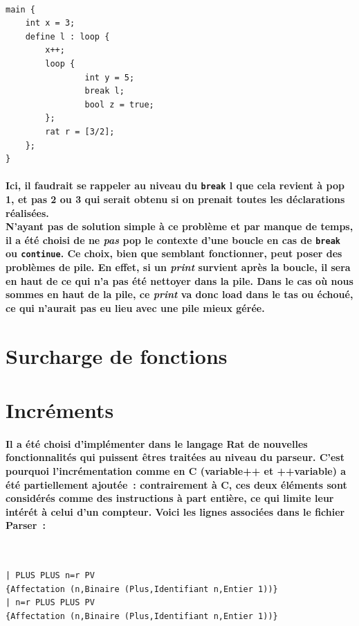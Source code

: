 \documentclass[french]{article}
\begin{document}
\, %
\begin{lstlisting}[language=ratcode]
main {
    int x = 3;
    define l : loop {
        x++;
        loop {
                int y = 5;
                break l;
                bool z = true;
        };
        rat r = [3/2];
    };
}
\end{lstlisting}
\paragraph*{Ici, il faudrait se rappeler au niveau du \texttt{break} l que cela revient à pop 1, et pas 2 ou 3 qui serait obtenu si on prenait toutes les déclarations réalisées.\\
N'ayant pas de solution simple à ce problème et par manque de temps, il a été choisi de ne \emph{pas} pop le contexte d'une boucle en cas de \texttt{break} ou \texttt{continue}.
Ce choix, bien que semblant fonctionner, peut poser des problèmes de pile. En effet, si un \emph{print} survient après la boucle, il sera en haut de ce qui n'a pas été nettoyer dans la pile.
Dans le cas où nous sommes en haut de la pile, ce \emph{print} va donc load dans le tas ou échoué, ce qui n'aurait pas eu lieu avec une pile mieux gérée.}

\section{Surcharge de fonctions}

\section{Incréments}
\paragraph*{Il a été choisi d'implémenter dans le langage Rat de nouvelles fonctionnalités qui puissent êtres traitées au niveau du parseur. C'est pourquoi
l'incrémentation comme en C (variable++ et ++variable) a été partiellement ajoutée~: contrairement à C, ces deux éléments sont considérés comme
des instructions à part entière, ce qui limite leur intérét à celui d'un compteur. Voici les lignes associées dans le fichier Parser~:}
\,
\begin{lstlisting}
| PLUS PLUS n=r PV 
{Affectation (n,Binaire (Plus,Identifiant n,Entier 1))}
| n=r PLUS PLUS PV 
{Affectation (n,Binaire (Plus,Identifiant n,Entier 1))}
\end{lstlisting}
\end{document}
